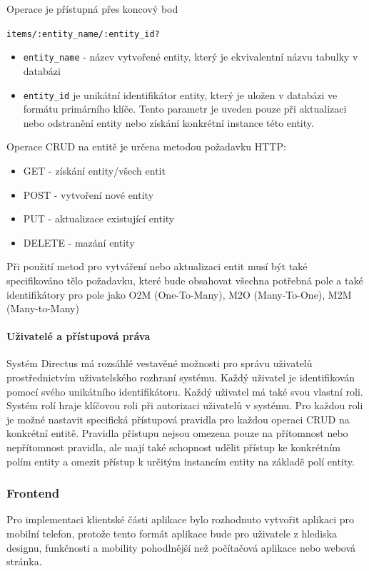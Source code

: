 \documentclass[a4paper, 11pt]{article}
\def\code#1{\texttt{#1}}
\begin{document}
Operace je přístupná přes koncový bod

\code {items/:entity\_name/:entity\_id?}
\begin{itemize}
    \item \code {entity\_name} - název vytvořené entity, který je ekvivalentní názvu tabulky v databázi
    \item \code {entity\_id} je unikátní identifikátor entity, který je uložen v databázi ve formátu primárního klíče. Tento parametr je uveden pouze při aktualizaci nebo odstranění entity nebo získání konkrétní instance této entity.
\end{itemize}

Operace CRUD na entitě je určena metodou požadavku HTTP:
\begin{itemize}
  \item GET - získání entity/všech entit
  \item POST - vytvoření nové entity
  \item PUT - aktualizace existující entity
  \item DELETE - mazání entity
  \end{itemize}

Při použití metod pro vytváření nebo aktualizaci entit musí být také specifikováno tělo požadavku, které bude obsahovat všechna potřebná pole a také identifikátory pro pole jako O2M (One-To-Many), M2O (Many-To-One), M2M (Many-to-Many)

\paragraph {Uživatelé a přístupová práva}
Systém Directus má rozsáhlé vestavěné možnosti pro správu uživatelů prostřednictvím uživatelského rozhraní systému. Každý uživatel je identifikován pomocí svého unikátního identifikátoru. Každý uživatel má také svou vlastní roli. Systém rolí hraje klíčovou roli při autorizaci uživatelů v systému. Pro každou roli je možné nastavit specifická přístupová pravidla pro každou operaci CRUD na konkrétní entitě. Pravidla přístupu nejsou omezena pouze na přítomnost nebo nepřítomnost pravidla, ale mají také schopnost udělit přístup ke konkrétním polím entity a omezit přístup k určitým instancím entity na základě polí entity.

\subsubsection{Frontend}
Pro implementaci klientské části aplikace bylo rozhodnuto vytvořit aplikaci pro mobilní telefon, protože tento formát aplikace bude pro uživatele z hlediska designu, funkčnosti a mobility pohodlnější než počítačová aplikace nebo webová stránka.
\end{document}
